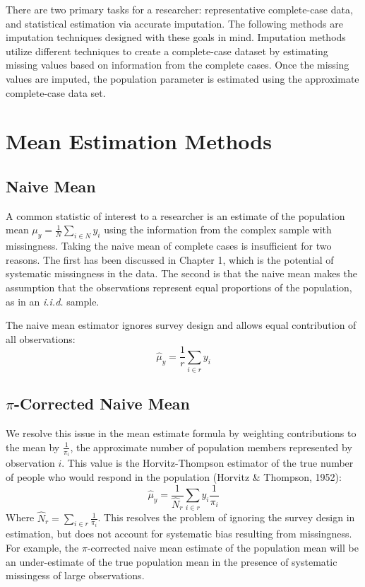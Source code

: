 \documentclass[12pt,twoside]{reedthesis}
\begin{document}
There are two primary tasks for a researcher: representative
complete-case data, and statistical estimation via accurate imputation.
The following methods are imputation techniques designed with these
goals in mind. Imputation methods utilize different techniques to create
a complete-case dataset by estimating missing values based on
information from the complete cases. Once the missing values are
imputed, the population parameter is estimated using the approximate
complete-case data set.

\section{Mean Estimation Methods}\label{mean-estimation-methods}

\subsection{Naive Mean}\label{naive-mean}

A common statistic of interest to a researcher is an estimate of the
population mean \(\mu_y = \frac{1}{N}\sum_{i \in N} y_i\) using the
information from the complex sample with missingness. Taking the naive
mean of complete cases is insufficient for two reasons. The first has
been discussed in Chapter 1, which is the potential of systematic
missingness in the data. The second is that the naive mean makes the
assumption that the observations represent equal proportions of the
population, as in an \emph{i.i.d.} sample.

The naive mean estimator ignores survey design and allows equal
contribution of all observations: \[
\hat \mu_y = \frac{1}{r} \sum_{i \in r} y_i
\]

\subsection{\texorpdfstring{\(\pi\)-Corrected Naive
Mean}{\textbackslash{}pi-Corrected Naive Mean}}\label{pi-corrected-naive-mean}

We resolve this issue in the mean estimate formula by weighting
contributions to the mean by \(\frac{1}{\pi_i}\), the approximate number
of population members represented by observation \(i\). This value is
the Horvitz-Thompson estimator of the true number of people who would
respond in the population (Horvitz \& Thompson, 1952): \[
\hat \mu_y = \frac{1}{\hat N_r} \sum_{i \in r} y_i \frac{1}{\pi_i}
\] Where \(\hat N_r = \sum_{i \in r} \frac{1}{\pi_i}\). This resolves
the problem of ignoring the survey design in estimation, but does not
account for systematic bias resulting from missingness. For example, the
\(\pi\)-corrected naive mean estimate of the population mean will be an
under-estimate of the true population mean in the presence of systematic
missingess of large observations.
\end{document}
